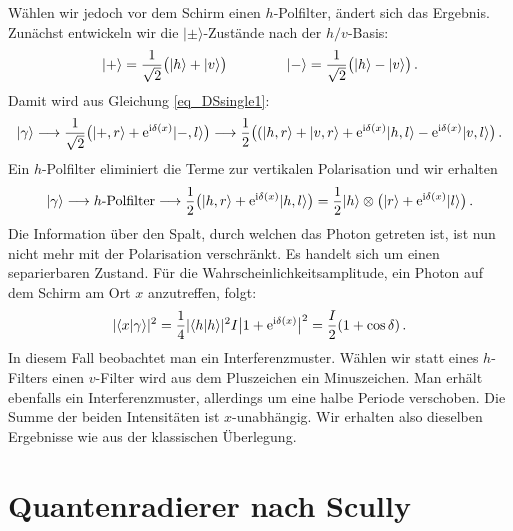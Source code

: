 W\"ahlen wir jedoch vor dem Schirm einen $h$-Polfilter, \"andert sich das Ergebnis.
Zun\"achst entwickeln wir die $|\pm\rangle$-Zust\"ande nach der $h/v$-Basis:
\begin{equation}
        |+\rangle = \frac{1}{\sqrt{2}} \big( |h\rangle  + |v\rangle \big) \hspace{1.5cm}
        | - \rangle = \frac{1}{\sqrt{2}} \big( |h\rangle  - |v\rangle \big) \, .
\end{equation}
Damit wird aus Gleichung \ref{eq_DSsingle1}:
\begin{equation}
          | \gamma \rangle \longrightarrow  \frac{1}{\sqrt{2}} \big(  |+ , r\rangle + {\rm e}^{{\rm i}\delta(x)} |- , l\rangle \big)  
        \longrightarrow
          \frac{1}{2} \big( ( |h , r\rangle + |v , r\rangle   + {\rm e}^{{\rm i}\delta(x)} | h , l\rangle 
                                          - {\rm e}^{{\rm i}\delta(x)}|v , l\rangle  \big) \, .  
\end{equation}
Ein $h$-Polfilter eliminiert die Terme zur vertikalen Polarisation und wir erhalten
\begin{equation}
          |\gamma \rangle \longrightarrow  \mbox{$h$-Polfilter}
        \longrightarrow
          \frac{1}{2} \big( |h , r\rangle   + {\rm e}^{{\rm i}\delta(x)} | h , l\rangle  \big)
          =    \frac{1}{2}  |h \rangle \otimes \big( |r \rangle   + {\rm e}^{{\rm i}\delta(x)} | l\rangle  \big)  \, .  
\end{equation}
Die Information \"uber den Spalt, durch welchen das Photon getreten ist, ist nun nicht mehr
mit der Polarisation verschr\"ankt. Es handelt sich um einen separierbaren Zustand. F\"ur die
Wahrscheinlichkeitsamplitude, ein Photon auf dem Schirm am Ort $x$ anzutreffen, folgt:
\begin{equation}
      | \langle x  |\gamma \rangle |^2 
          =    \frac{1}{4} | \langle h |h \rangle|^2  I  \big| 1  + {\rm e}^{{\rm i}\delta(x)} \big|^2 
          = \frac{I}{2} ( 1 + \cos \delta)  \, .  
\end{equation}
In diesem Fall beobachtet man ein Interferenzmuster. W\"ahlen wir statt eines $h$-Filters einen
$v$-Filter wird aus dem Pluszeichen ein Minuszeichen. Man erh\"alt
ebenfalls ein Interferenzmuster, allerdings um eine halbe Periode verschoben. Die Summe
der beiden Intensit\"aten ist $x$-unabh\"angig. Wir erhalten also dieselben Ergebnisse wie aus
der klassischen \"Uberlegung.

\section{Quantenradierer nach Scully}
\label{sec_Scully}

